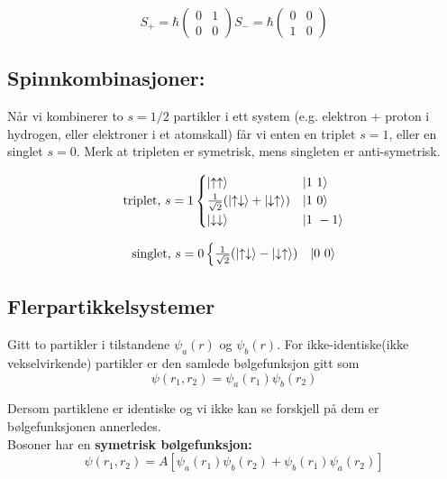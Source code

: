 \documentclass[10p,a4paper]{article}
\begin{document}
\begin{equation*}
S_+ = \hbar
\begin{pmatrix}
0 & 1\\
0 & 0
\end{pmatrix}
S_- = \hbar
\begin{pmatrix}
0 & 0\\
1 & 0
\end{pmatrix}
\end{equation*}

\subsection*{Spinnkombinasjoner:}
Når vi kombinerer to $s = 1/2$ partikler i ett system (e.g. elektron + proton i hydrogen, eller elektroner i et atomskall) får vi enten en triplet $s = 1$, eller en singlet $s = 0$. Merk at tripleten er symetrisk, mens singleten er anti-symetrisk.

\begin{align*}
\text{triplet, } s = 1
\begin{cases}
\ket{\uparrow \uparrow} & \ket{1\ 1}\\
\tfrac{1}{\sqrt{2}}(\ket{\uparrow \downarrow} + \ket{\downarrow \uparrow}) & \ket{1\ 0}\\
\ket{\downarrow \downarrow} & \ket{1\ -1}
\end{cases}
\end{align*}

\begin{align*}
\text{singlet, } s = 0
\begin{cases}
\tfrac{1}{\sqrt{2}}(\ket{\uparrow \downarrow} - \ket{\downarrow \uparrow}) & \ket{0\ 0}\\
\end{cases}
\end{align*}

\subsection*{Flerpartikkelsystemer}
Gitt to partikler i tilstandene $\psi_a(r)$ og $\psi_b(r)$. For ikke-identiske(ikke vekselvirkende) partikler er den samlede bølgefunksjon gitt som
\[\psi(r_1, r_2) = \psi_a(r_1)\psi_b(r_2)\]

Dersom partiklene er identiske og vi ikke kan se forskjell på dem er bølgefunksjonen annerledes.
\\

Bosoner har en \textbf{symetrisk bølgefunksjon:}
\[ \psi(r_1,r_2) = A[\psi_a(r_1)\psi_b(r_2) + \psi_b(r_1)\psi_a(r_2)] \]
\end{document}
